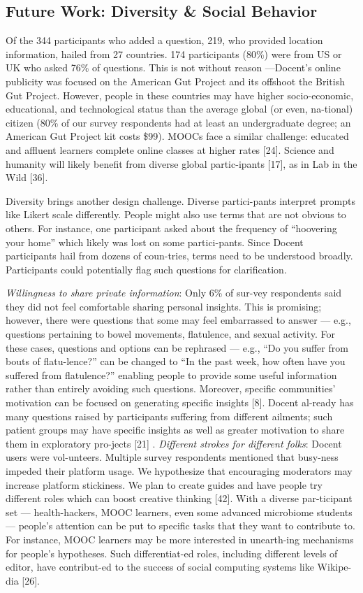 \subsection{Future Work: Diversity \& Social Behavior}
Of the 344 participants who added a question, 219, who provided location information, hailed from 27 countries. 174 participants (80\%) were from US or UK who asked 76\% of questions. This is not without reason —Docent’s online publicity was focused on the American Gut Project and its offshoot the British Gut Project. However, people in these countries may have higher socio-economic, educational, and technological status than the average global (or even, na-tional) citizen (80\% of our survey respondents had at least an undergraduate degree; an American Gut Project kit costs \$99). MOOCs face a similar challenge: educated and affluent learners complete online classes at higher rates [24]. Science and humanity will likely benefit from diverse global partic-ipants [17], as in Lab in the Wild [36].

Diversity brings another design challenge. Diverse partici-pants interpret prompts like Likert scale differently. People might also use terms that are not obvious to others. For instance, one participant asked about the frequency of “hoovering your home” which likely was lost on some partici-pants. Since Docent participants hail from dozens of coun-tries, terms need to be understood broadly. Participants could potentially flag such questions for clarification. 

\textit{Willingness to share private information}: Only 6\% of sur-vey respondents said they did not feel comfortable sharing personal insights. This is promising; however, there were questions that some may feel embarrassed to answer — e.g., questions pertaining to bowel movements, flatulence, and sexual activity. For these cases, questions and options can be rephrased — e.g., “Do you suffer from bouts of flatu-lence?” can be changed to “In the past week, how often have you suffered from flatulence?” enabling people to provide some useful information rather than entirely avoiding such questions. Moreover, specific communities’ motivation can be focused on generating specific insights [8]. Docent al-ready has many questions raised by participants suffering from different ailments; such patient groups may have specific insights as well as greater motivation to share them in exploratory pro-jects [21]
.
\textit{Different strokes for different folks}: Docent users were vol-unteers. Multiple survey respondents mentioned that busy-ness impeded their platform usage. We hypothesize that encouraging moderators may increase platform stickiness. We plan to create guides and have people try different roles which can boost creative thinking [42]. With a diverse par-ticipant set — health-hackers, MOOC learners, even some advanced microbiome students — people’s attention can be put to specific tasks that they want to contribute to. For instance, MOOC learners may be more interested in unearth-ing mechanisms for people’s hypotheses. Such differentiat-ed roles, including different levels of editor, have contribut-ed to the success of social computing systems like Wikipe-dia [26].

